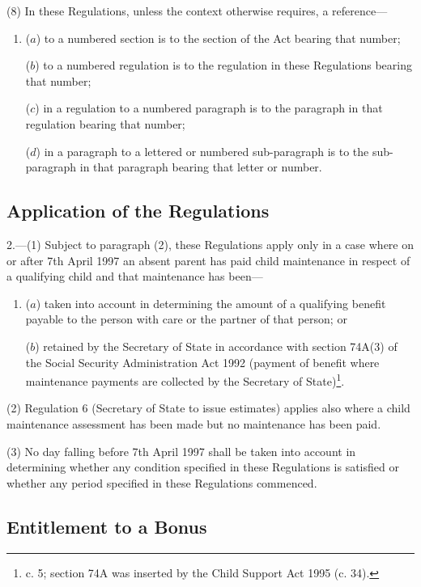 \documentclass[a4paper]{article}
\begin{document}
(8) In these Regulations, unless the context otherwise requires, a reference—
\begin{enumerate}\item[]
($a$) to a numbered section is to the section of the Act bearing that number;

($b$) to a numbered regulation is to the regulation in these Regulations bearing that number;

($c$) in a regulation to a numbered paragraph is to the paragraph in that regulation bearing that number;

($d$) in a paragraph to a lettered or numbered sub-paragraph is to the sub-paragraph in that paragraph bearing that letter or number.
\end{enumerate}

\subsection[2. Application of the Regulations]{Application of the Regulations}

2.—(1) Subject to paragraph (2), these Regulations apply only in a case where on or after 7th April 1997 an absent parent has paid child maintenance in respect of a qualifying child and that maintenance has been—
\begin{enumerate}\item[]
($a$) taken into account in determining the amount of a qualifying benefit payable to the person with care or the partner of that person; or

($b$) retained by the Secretary of State in accordance with section 74A(3) of the Social Security Administration Act 1992 (payment of benefit where maintenance payments are collected by the Secretary of State)\footnote{ c. 5; section 74A was inserted by the Child Support Act 1995 (c. 34).}.
\end{enumerate}

(2) Regulation 6 (Secretary of State to issue estimates) applies also where a child maintenance assessment has been made but no maintenance has been paid.

(3) No day falling before 7th April 1997 shall be taken into account in determining whether any condition specified in these Regulations is satisfied or whether any period specified in these Regulations commenced.

\subsection[3. Entitlement to a Bonus]{Entitlement to a Bonus}
\end{document}
